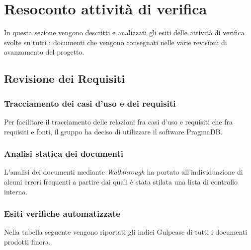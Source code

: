 \section{Resoconto attività di verifica}
In questa sezione vengono descritti e analizzati gli esiti delle attività
di verifica svolte su tutti i documenti che vengono consegnati nelle varie 
revisioni di avanzamento del progetto.

\subsection{Revisione dei Requisiti}
\subsubsection{Tracciamento dei casi d'uso e dei requisiti}
Per facilitare il tracciamento delle relazioni fra casi d'uso e requisiti che
fra requisiti e fonti, il gruppo ha deciso di utilizzare il software PragmaDB.

\subsubsection{Analisi statica dei documenti}
L'analisi dei documenti mediante \textit{Walkthrough}\glo{} ha portato 
all'individuazione di alcuni errori frequenti a partire dai quali è stata 
stilata una lista di controllo interna.

\subsubsection{Esiti verifiche automatizzate}
Nella tabella seguente vengono riportati gli indici Gulpease\glo{} di tutti
i documenti prodotti finora.

	
